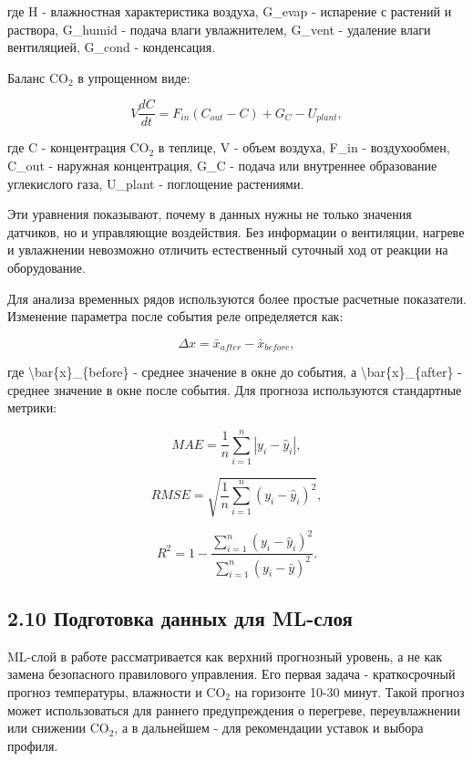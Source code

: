 \documentclass[a4paper,14pt]{extarticle}
\renewcommand{\texttt}[1]{\textnormal{#1}}
\begin{document}
где \texttt{H} - влажностная характеристика воздуха, \texttt{G\_evap} -
испарение с растений и раствора, \texttt{G\_humid} - подача влаги
увлажнителем, \texttt{G\_vent} - удаление влаги вентиляцией,
\texttt{G\_cond} - конденсация.

Баланс CO\(_2\) в упрощенном виде:

\[
V \frac{dC}{dt} = F_{in}(C_{out} - C) + G_C - U_{plant},
\]

где \texttt{C} - концентрация CO\(_2\) в теплице, \texttt{V} - объем
воздуха, \texttt{F\_in} - воздухообмен, \texttt{C\_out} - наружная
концентрация, \texttt{G\_C} - подача или внутреннее образование
углекислого газа, \texttt{U\_plant} - поглощение растениями.

Эти уравнения показывают, почему в данных нужны не только значения
датчиков, но и управляющие воздействия. Без информации о вентиляции,
нагреве и увлажнении невозможно отличить естественный суточный ход от
реакции на оборудование.

Для анализа временных рядов используются более простые расчетные
показатели. Изменение параметра после события реле определяется как:

\[
\Delta x = \bar{x}_{after} - \bar{x}_{before},
\]

где \texttt{\textbackslash{}bar\{x\}\_\{before\}} - среднее значение в
окне до события, а \texttt{\textbackslash{}bar\{x\}\_\{after\}} -
среднее значение в окне после события. Для прогноза используются
стандартные метрики:

\[
MAE = \frac{1}{n}\sum_{i=1}^{n}|y_i-\hat{y}_i|,
\]

\[
RMSE = \sqrt{\frac{1}{n}\sum_{i=1}^{n}(y_i-\hat{y}_i)^2},
\]

\[
R^2 = 1 - \frac{\sum_{i=1}^{n}(y_i-\hat{y}_i)^2}{\sum_{i=1}^{n}(y_i-\bar{y})^2}.
\]

\subsection{2.10 Подготовка данных для
ML-слоя}\label{ux43fux43eux434ux433ux43eux442ux43eux432ux43aux430-ux434ux430ux43dux43dux44bux445-ux434ux43bux44f-ml-ux441ux43bux43eux44f}

ML-слой в работе рассматривается как верхний прогнозный уровень, а не
как замена безопасного правилового управления. Его первая задача -
краткосрочный прогноз температуры, влажности и CO\(_2\) на горизонте
10-30 минут. Такой прогноз может использоваться для раннего
предупреждения о перегреве, переувлажнении или снижении CO\(_2\), а в
дальнейшем - для рекомендации уставок и выбора профиля.
\end{document}
